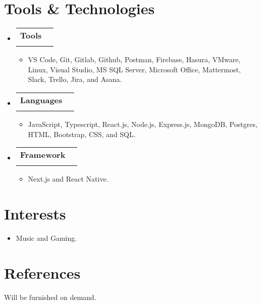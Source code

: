 \documentclass[letterpaper,11pt]{article}
\makeatletter
\newcommand{\resumeItem}[1]{
  \item\small{
    {#1 \vspace{-2pt}}
  }
}
\newcommand{\resumeSubheading}[4]{
  \vspace{-1pt}\item
    \begin{tabular*}{0.97\textwidth}[t]{l@{\extracolsep{\fill}}r}
      \textbf{#1} & #2 \\
      \textit{\small#3} & \textit{\small #4} \\
    \end{tabular*}\vspace{-6pt}
}
\newcommand{\resumeSubHeadingListStart}{\begin{itemize}[leftmargin=0.15in, label={}]}
\newcommand{\resumeSubHeadingListEnd}{\end{itemize}}
\newcommand{\resumeItemListStart}{\begin{itemize}}
\newcommand{\resumeItemListEnd}{\end{itemize}\vspace{-4pt}}
\makeatother
\begin{document}
\section{Tools \& Technologies}
  \resumeSubHeadingListStart
      \resumeSubheading
      {Tools}{}{}{}\vspace{-12pt}
      \resumeItemListStart
        \resumeItem{VS Code, Git, Gitlab, Github, Postman, Firebase, Hasura, VMware, Linux, Visual Studio, MS SQL Server, Microsoft Office, Mattermost, Slack, Trello, Jira, and Asana.}
    \resumeItemListEnd
    \resumeSubheading
    {Languages}{}{}{}\vspace{-12pt}
      \resumeItemListStart
        \resumeItem{JavaScript, Typescript,  React.js, Node.js, Express.js,  MongoDB, Postgres, HTML, Bootstrap, CSS, and SQL.}
    \resumeItemListEnd
    \resumeSubheading
    {Framework}{}{}{}\vspace{-12pt}
      \resumeItemListStart
        \resumeItem{Next.js and React Native.}
    \resumeItemListEnd
  \resumeSubHeadingListEnd


\section{Interests}
      \resumeItemListStart
        \resumeItem{Music and Gaming.}
    \resumeItemListEnd

\section{References}
    \begin{itemize}[leftmargin=0.15in, label={}]
    \small{\item{
     \textbf{}{Will be furnished on demand.} \\
    }}
 \end{itemize}
      



\end{document}
